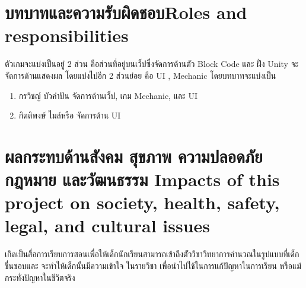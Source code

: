 \section{\ifcpe บทบาทและความรับผิดชอบ\else Roles and responsibilities\fi}
ตัวเกมจะแบ่งเป็นอยู่ 2 ส่วน คือส่วนที่อยู่บนเว็ปซึ่งจัดการด้านตัว Block Code และ ฝั่ง Unity จะจัดการด้านแสดงผล โดยแบ่งไปอีก
2 ส่วนย่อย คือ UI , Mechanic โดยบทบาทจะแบ่งเป็น
\begin{enumerate}
    \item กรวิชญ์ บัวคำปัน จัดการด้านเว็ป, เกม Mechanic, และ UI
    \item กิตติพงษ์ ไมล์หรือ จัดการด้าน UI
\end{enumerate}

\section{\ifcpe%
ผลกระทบด้านสังคม สุขภาพ ความปลอดภัย กฎหมาย และวัฒนธรรม
\else%
Impacts of this project on society, health, safety, legal, and cultural issues
\fi}

เกิดเป็นสื่อการเรียบการสอนเพื่อให้เด็กนักเรียนสามารถเข้าถึงตััววิชาวิทยาการคำนวณในรูปแบบที่เด็กชื่นชอบและ จะทำให้เด็กนั้นมีความเข้าใจ
ในรายวิชา เพื่อนำไปใช้ในการแก้ปัญหาในการเรียน หรือแม้กระทั่งปัญหาในชีวิตจริง